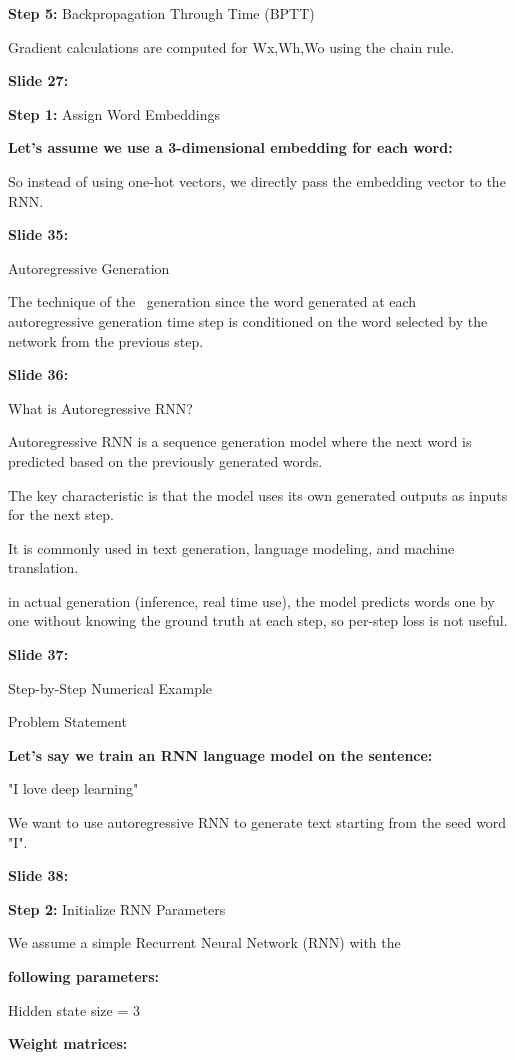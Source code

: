 \documentclass[11pt,a4paper]{article}
\begin{document}
\textbf{Step 5:}  Backpropagation Through Time (BPTT)

Gradient calculations are computed for Wx,Wh,Wo using the chain rule.

\textbf{Slide 27:}

\textbf{Step 1:}  Assign Word Embeddings

\textbf{Let’s assume we use a 3-dimensional embedding for each word:} 

So instead of using one-hot vectors, we directly pass the embedding vector to the RNN.

\textbf{Slide 35:}

Autoregressive Generation

The technique of the  generation since the word generated at each  autoregressive generation time step is conditioned on the word selected by the network from the previous step.

\textbf{Slide 36:}

What is Autoregressive RNN?

Autoregressive RNN is a sequence generation model where the next word is predicted based on the previously generated words.

The key characteristic is that the model uses its own generated outputs as inputs for the next step.

It is commonly used in text generation, language modeling, and machine translation.

in actual generation (inference, real time use), the model predicts words one by one without knowing the ground truth at each step, so per-step loss is not useful.

\textbf{Slide 37:}

Step-by-Step Numerical Example

Problem Statement

\textbf{Let's say we train an RNN language model on the sentence:} 

"I love deep learning"

We want to use autoregressive RNN to generate text starting from the seed word "I".

\textbf{Slide 38:}

\textbf{Step 2:}  Initialize RNN Parameters

We assume a simple Recurrent Neural Network (RNN) with the

\textbf{following parameters:} 

Hidden state size = 3

\textbf{Weight matrices:} 
\end{document}
